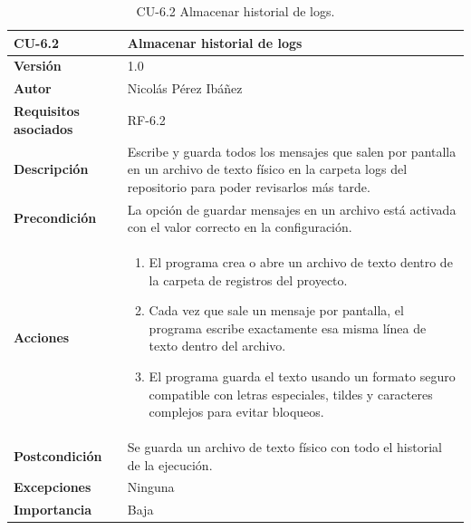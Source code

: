 \begin{table}[p]
	\centering
	\begin{tabularx}{\linewidth}{ p{} p{} }
		\toprule
		\textbf{CU-6.2}  & \textbf{Almacenar historial de logs}\\
		\toprule
		\textbf{Versión}              & 1.0    \\
		\textbf{Autor}                & Nicolás Pérez Ibáñez \\
		\textbf{Requisitos asociados} & RF-6.2 \\
		\textbf{Descripción}          & Escribe y guarda todos los mensajes que salen por pantalla en un archivo de texto físico en la carpeta logs del repositorio para poder revisarlos más tarde. \\
		\textbf{Precondición}         & La opción de guardar mensajes en un archivo está activada con el valor correcto en la configuración. \\
		\textbf{Acciones}             &
		\begin{enumerate}
			\def\labelenumi{\arabic{enumi}.}
			\tightlist
			\item El programa crea o abre un archivo de texto dentro de la carpeta de registros del proyecto.
			\item Cada vez que sale un mensaje por pantalla, el programa escribe exactamente esa misma línea de texto dentro del archivo.
			\item El programa guarda el texto usando un formato seguro compatible con letras especiales, tildes y caracteres complejos para evitar bloqueos.
		\end{enumerate}\\
		\textbf{Postcondición}        & Se guarda un archivo de texto físico con todo el historial de la ejecución. \\
		\textbf{Excepciones}          & Ninguna \\
		\textbf{Importancia}          & Baja \\
		\bottomrule
	\end{tabularx}
	\caption{CU-6.2 Almacenar historial de logs.}
\end{table}

